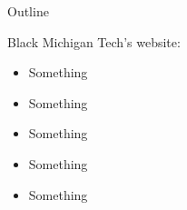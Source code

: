 \documentclass{MichiganTech}
\begin{document}
\maketitle

\nontitleslidesetup


%
\begin{frame}[t]{Outline}
  \vspace*{0.10in}
  \begin{reference}{4mm}{85.5mm}{Black}
    Michigan Tech's website:
    \href{http://www.mtu.edu}{}
  \end{reference}

  \begin{itemize}
    \item Something
    \item Something
    \item Something
    \item Something
    \item Something
  \end{itemize}
\end{frame}
\end{document}
